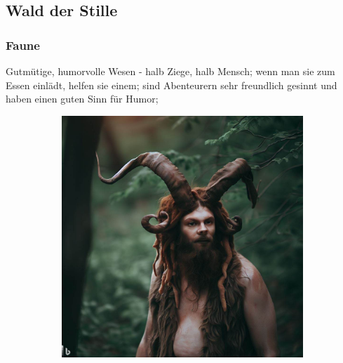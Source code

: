 \documentclass[11pt, twoside]{article}
\begin{document}
\newpage

\subsection{Wald der Stille}
\label{sec:orgf8bacb6}
\subsubsection{Faune\label{faun}}
\label{sec:orga749114}
Gutmütige, humorvolle Wesen - halb Ziege, halb Mensch; wenn man sie zum Essen einlädt, helfen sie einem; sind Abenteurern sehr freundlich gesinnt und haben einen guten Sinn für Humor;
\begin{figure}[H]
\centering
\caption{Faune}
\label{fig:faun}
  \begin{subfigure}{0.3\textwidth}
    \centering
    \includegraphics[width=0.99\linewidth]{faun1.jpeg}
  \end{subfigure}%
  \begin{subfigure}{0.3\textwidth}
    \centering

\end{subfigure}
\end{figure}
\end{document}
